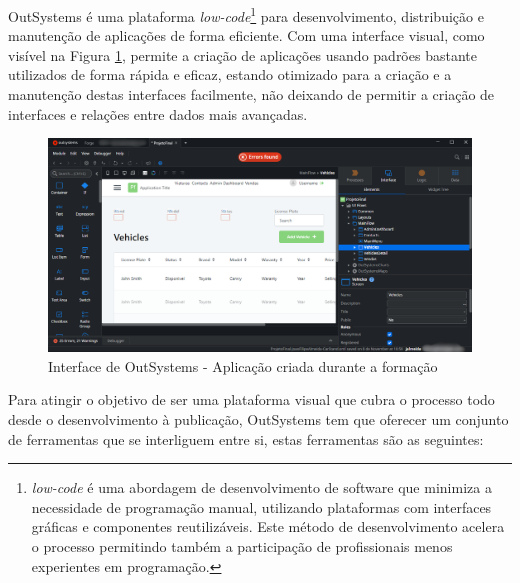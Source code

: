       OutSystems é uma plataforma \textit{low-code}\footnote{\textit{low-code} é uma abordagem de desenvolvimento de software que minimiza a necessidade de programação manual, utilizando plataformas com interfaces gráficas e componentes reutilizáveis. Este método de desenvolvimento acelera o processo permitindo também a participação de profissionais menos experientes em programação.} para desenvolvimento, distribuição e manutenção de aplicações de forma eficiente. Com uma interface visual, como visível na Figura \ref{fig:interfaceoutsystems}, permite a criação de aplicações usando padrões bastante utilizados de forma rápida e eficaz, estando otimizado para a criação e a manutenção destas interfaces facilmente, não deixando de permitir a criação de interfaces e relações entre dados mais avançadas.

      \begin{figure}[H]
          \centering
          \includegraphics[width=\textwidth]{imgs/InterfaceOutSystems.png}
          \caption{Interface de OutSystems - Aplicação criada durante a formação}\label{fig:interfaceoutsystems}
      \end{figure}

      Para atingir o objetivo de ser uma plataforma visual que cubra o processo todo desde o desenvolvimento à publicação, OutSystems tem que oferecer um conjunto de ferramentas que se interliguem entre si, estas ferramentas são as seguintes:

